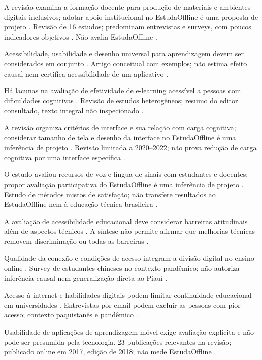 A revisão examina a formação docente para produção de materiais e ambientes digitais inclusivos; adotar apoio institucional no EstudaOffline é uma proposta de projeto \citep{bong2021}. Revisão de 16 estudos; predominam entrevistas e surveys, com poucos indicadores objetivos \citep{bong2021}. Não avalia EstudaOffline \citep{bong2021}.

Acessibilidade, usabilidade e desenho universal para aprendizagem devem ser considerados em conjunto \citep{choi2024}. Artigo conceitual com exemplos; não estima efeito causal nem certifica acessibilidade de um aplicativo \citep{choi2024}.

Há lacunas na avaliação de efetividade de e-learning acessível a pessoas com dificuldades cognitivas \citep{cinquin2019}. Revisão de estudos heterogêneos; resumo do editor consultado, texto integral não inspecionado \citep{cinquin2019}.

A revisão organiza critérios de interface e sua relação com carga cognitiva; considerar tamanho de tela e desenho da interface no EstudaOffline é uma inferência de projeto \citep{cob2023}. Revisão limitada a 2020–2022; não prova redução de carga cognitiva por uma interface específica \citep{cob2023}.

O estudo avaliou recursos de voz e língua de sinais com estudantes e docentes; propor avaliação participativa do EstudaOffline é uma inferência de projeto \citep{farhan2020}. Estudo de métodos mistos de satisfação; não transfere resultados ao EstudaOffline nem à educação técnica brasileira \citep{farhan2020}.

A avaliação de acessibilidade educacional deve considerar barreiras atitudinais além de aspectos técnicos \citep{gobbo2023}. A síntese não permite afirmar que melhorias técnicas removem discriminação ou todas as barreiras \citep{gobbo2023}.

Qualidade da conexão e condições de acesso integram a divisão digital no ensino online \citep{guo2022}. Survey de estudantes chineses no contexto pandêmico; não autoriza inferência causal nem generalização direta ao Piauí \citep{guo2022}.

Acesso à internet e habilidades digitais podem limitar continuidade educacional em universidades \citep{jamil2023}. Entrevistas por email podem excluir as pessoas com pior acesso; contexto paquistanês e pandêmico \citep{jamil2023}.

Usabilidade de aplicações de aprendizagem móvel exige avaliação explícita e não pode ser presumida pela tecnologia. 23 publicações relevantes na revisão; publicado online em 2017, edição de 2018; não mede EstudaOffline \citep{kumar2017}.

